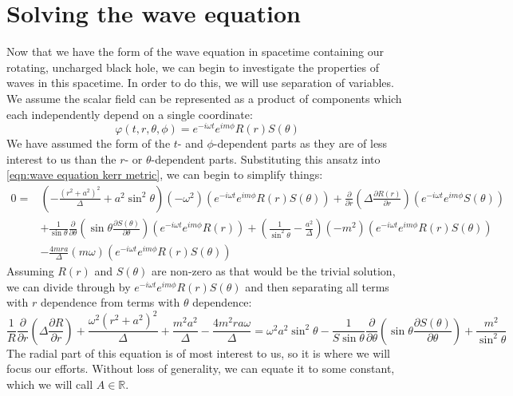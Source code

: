 \documentclass[11pt]{article}
\numberwithin{equation}{section}
\numberwithin{figure}{section}
\numberwithin{table}{section}
\begin{document}
\section{Solving the wave equation}\label{sec:Solving the wave equation}
\par Now that we have the form of the wave equation in spacetime containing our rotating, uncharged black hole, we can begin to investigate the properties of waves in this spacetime. In order to do this, we will use separation of variables. We assume the scalar field can be represented as a product of components which each independently depend on a single coordinate:
\begin{equation}
    \varphi(t,r,\theta,\phi)=e^{-i\omega t}e^{im\phi}R(r)S(\theta)
    \label{eqn:sep of variables ansatz}
\end{equation}
We have assumed the form of the $t$- and $\phi$-dependent parts as they are of less interest to us than the $r$- or $\theta$-dependent parts. Substituting this ansatz into \cref{eqn:wave equation kerr metric}, we can begin to simplify things:
\begin{align*}
    0=&\left(-\frac{(r^2+a^2)^2}{\Delta}+a^2\sin^2\theta\right)(-\omega^2)(e^{-i\omega t}e^{im\phi}R(r)S(\theta))+\frac{\partial}{\partial r}\left(\Delta\frac{\partial R(r)}{\partial r}\right)(e^{-i\omega t}e^{im\phi}S(\theta))\\&+\frac{1}{\sin\theta}\frac{\partial}{\partial\theta}\left(\sin\theta\frac{\partial S(\theta)}{\partial\theta}\right)(e^{-i\omega t}e^{im\phi}R(r))+\left(\frac{1}{\sin^2\theta}-\frac{a^2}{\Delta}\right)(-m^2)(e^{-i\omega t}e^{im\phi}R(r)S(\theta))\\&-\frac{4mra}{\Delta}(m\omega)(e^{-i\omega t}e^{im\phi}R(r)S(\theta))
\end{align*}
Assuming $R(r)$ and $S(\theta)$ are non-zero as that would be the trivial solution, we can divide through by $e^{-i\omega t}e^{im\phi}R(r)S(\theta)$ and then separating all terms with $r$ dependence from terms with $\theta$ dependence:
\begin{equation*}
    \frac{1}{R}\frac{\partial}{\partial r}\left(\Delta\frac{\partial R}{\partial r}\right)+\frac{\omega^2(r^2+a^2)^2}{\Delta}+\frac{m^2a^2}{\Delta}-\frac{4m^2ra\omega}{\Delta}=\omega^2a^2\sin^2\theta-\frac{1}{S\sin\theta}\frac{\partial}{\partial\theta}\left(\sin\theta\frac{\partial S(\theta)}{\partial\theta}\right)+\frac{m^2}{\sin^2\theta}
\end{equation*}
The radial part of this equation is of most interest to us, so it is where we will focus our efforts. Without loss of generality, we can equate it to some constant, which we will call $A\in\mathbb{R}$.
\end{document}
